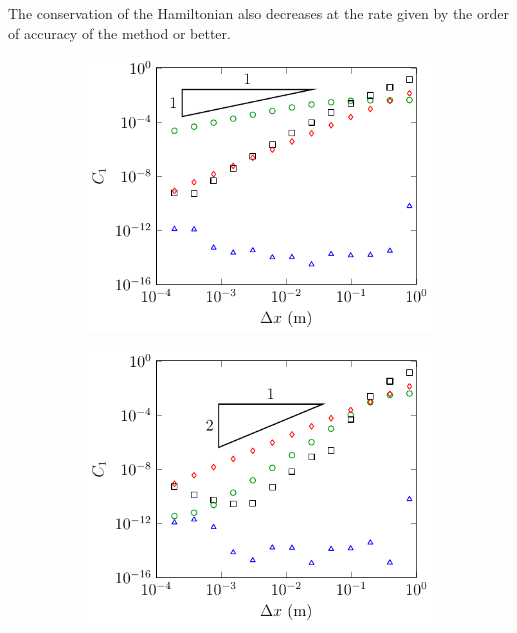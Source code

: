 The conservation of the Hamiltonian also decreases at the rate given by the order of accuracy of the method or better.
%
\begin{figure}
	\centering
	\begin{subfigure}{0.5\textwidth}
		\includegraphics[width=\textwidth]{./chp5/figures/Analytic/Soliton/C1/FDVM1.pdf}
		\vspace{0.5cm}
	\end{subfigure}%
	\begin{subfigure}{0.5\textwidth}
		\includegraphics[width=\textwidth]{./chp5/figures/Analytic/Soliton/C1/FDVM2.pdf}

\end{subfigure}
\end{figure}
